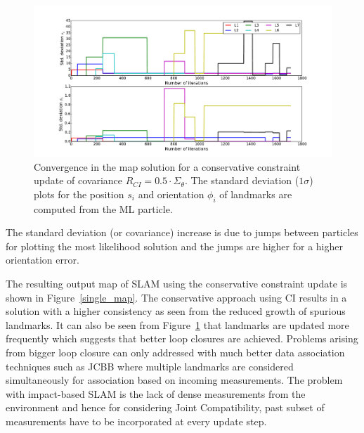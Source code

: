 \begin{figure}
\centering
\hspace*{-1cm}\includegraphics[scale=0.4]{./images/landmark_ci}
\caption{Convergence in the map solution for a conservative constraint update of covariance $R_{CI}=0.5\cdot\Sigma_{\theta}$. The standard deviation ($1\sigma$) plots for the position $s_i$ and orientation $\phi_i$ of landmarks are computed from the ML particle.}
\label{landmark_ci}
\end{figure}

\begin{rem}
The standard deviation (or covariance) increase is due to jumps between particles for plotting the most likelihood solution and the jumps are higher for a higher orientation error.
\end{rem}

The resulting output map of SLAM using the conservative constraint update is shown in Figure~\ref{single_map}. The conservative approach using CI results in a solution with a higher consistency as seen from the reduced growth of spurious landmarks. It can also be seen from Figure~\ref{landmark_ci} that landmarks are updated more frequently which suggests that better loop closures are achieved. Problems arising from bigger loop closure can only addressed with much better data association techniques such as \acf{JCBB} where multiple landmarks are considered simultaneously for association based on incoming measurements. The problem with impact-based SLAM is the lack of dense measurements from the environment and hence for considering Joint Compatibility, past subset of measurements have to be incorporated at every update step. 
 
